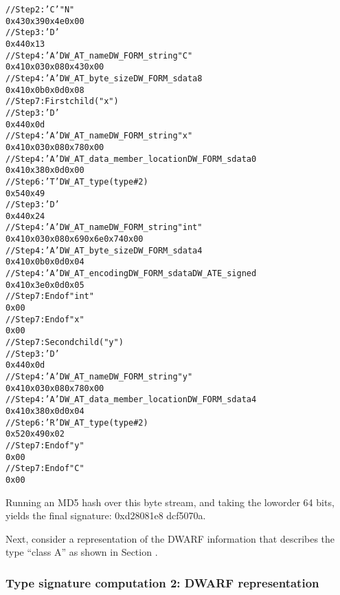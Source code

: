 \begin{alltt}
// Step 2: 'C'  "N"
0x43 0x39 0x4e 0x00
// Step 3: 'D' 
0x44 0x13
// Step 4: 'A' DW\-\_AT\-\_name DW\-\_FORM\-\_string "C"
0x41 0x03 0x08 0x43 0x00
// Step 4: 'A' DW\-\_AT\-\_byte\-\_size DW\-\_FORM\-\_sdata 8
0x41 0x0b 0x0d 0x08
// Step 7: First child ("x")
    // Step 3: 'D' 
    0x44 0x0d
    // Step 4: 'A' DW\-\_AT\-\_name DW\-\_FORM\-\_string "x"
    0x41 0x03 0x08 0x78 0x00
    // Step 4: 'A' DW\-\_AT\-\_data\-\_member\-\_location DW\-\_FORM\-\_sdata 0
    0x41 0x38 0x0d 0x00
    // Step 6: 'T' DW\-\_AT\-\_type (type \#2)
    0x54 0x49
        // Step 3: 'D' 
        0x44 0x24
        // Step 4: 'A' DW\-\_AT\-\_name DW\-\_FORM\-\_string "int"
        0x41 0x03 0x08 0x69 0x6e 0x74 0x00
        // Step 4: 'A' DW\-\_AT\-\_byte\-\_size DW\-\_FORM\-\_sdata 4
        0x41 0x0b 0x0d 0x04
        // Step 4: 'A' DW\-\_AT\-\_encoding DW\-\_FORM\-\_sdata DW\-\_ATE\-\_signed
        0x41 0x3e 0x0d 0x05
        // Step 7: End of  "int"
        0x00
    // Step 7: End of  "x"
    0x00
// Step 7: Second child ("y")
    // Step 3: 'D' 
    0x44 0x0d
    // Step 4: 'A' DW\-\_AT\-\_name DW\-\_FORM\-\_string "y"
    0x41 0x03 0x08 0x78 0x00
    // Step 4: 'A' DW\-\_AT\-\_data\-\_member\-\_location DW\-\_FORM\-\_sdata 4
    0x41 0x38 0x0d 0x04
    // Step 6: 'R' DW\-\_AT\-\_type (type \#2)
    0x52 0x49 0x02
    // Step 7: End of  "y"
    0x00
// Step 7: End of  "C"
0x00
\end{alltt}

Running an MD5 hash over this byte stream, and taking the
low\dash order 64 bits, yields the final signature: 
0xd28081e8 dcf5070a.

Next, consider a representation of the DWARF information that
describes the type ``class A'' as shown in 
Section .


\subsubsection{Type signature  computation 2: DWARF representation}
\label{app:typesignaturecomputation2dwarfrepresentation}

